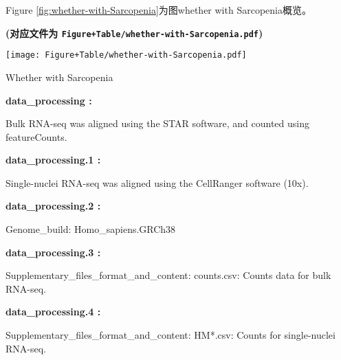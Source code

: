 \documentclass[
]{article}
\begin{document}
Figure \ref{fig:whether-with-Sarcopenia}为图whether with Sarcopenia概览。

\textbf{(对应文件为 \texttt{Figure+Table/whether-with-Sarcopenia.pdf})}

\def\@captype{figure}
\begin{center}
\texttt{[image: Figure+Table/whether-with-Sarcopenia.pdf]}
\caption{Whether with Sarcopenia}\label{fig:whether-with-Sarcopenia}
\end{center}

\begin{center}\begin{tcolorbox}[colback=gray!10, colframe=gray!50, width=0.9\linewidth, arc=1mm, boxrule=0.5pt]
\textbf{
data\_processing
:}

\vspace{0.5em}

    Bulk RNA-seq was aligned using the STAR software, and
counted using featureCounts.

\vspace{2em}


\textbf{
data\_processing.1
:}

\vspace{0.5em}

    Single-nuclei RNA-seq was aligned using the CellRanger
software (10x).

\vspace{2em}


\textbf{
data\_processing.2
:}

\vspace{0.5em}

    Genome\_build: Homo\_sapiens.GRCh38

\vspace{2em}


\textbf{
data\_processing.3
:}

\vspace{0.5em}

    Supplementary\_files\_format\_and\_content: counts.csv:
Counts data for bulk RNA-seq.

\vspace{2em}


\textbf{
data\_processing.4
:}

\vspace{0.5em}

    Supplementary\_files\_format\_and\_content: HM*.csv: Counts
for single-nuclei RNA-seq.

\vspace{2em}
\end{tcolorbox}
\end{center}
\end{document}
